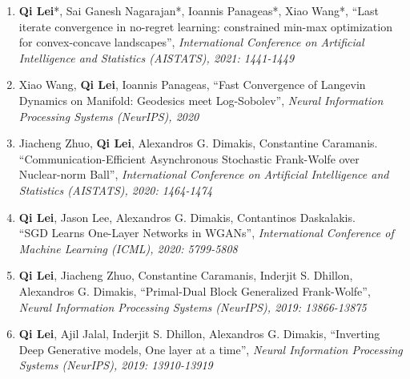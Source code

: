 \documentclass[margin, 10pt]{res} %
\begin{document}
\begin{resume}
\begin{enumerate}
	\item{\textbf{Qi Lei}*, Sai Ganesh Nagarajan*, Ioannis Panageas*, Xiao Wang*, ``Last iterate convergence in no-regret learning: constrained min-max optimization for convex-concave landscapes'',\textit{ International Conference on
			Artificial Intelligence and Statistics (AISTATS), 2021: 1441-1449}}
	\item{ Xiao Wang, \textbf{Qi Lei}, Ioannis Panageas, ``Fast Convergence of Langevin Dynamics on Manifold: Geodesics meet Log-Sobolev'', \textit{Neural Information Processing Systems (NeurIPS), 2020 }  }
\item{Jiacheng Zhuo, \textbf{Qi Lei}, Alexandros G. Dimakis, Constantine 
      Caramanis.\\ ``Communication-Efficient Asynchronous Stochastic 
    Frank-Wolfe over Nuclear-norm Ball'', \textit{ International Conference on Artificial Intelligence and Statistics (AISTATS), 2020: 1464-1474} }
\item{\textbf{Qi Lei}, Jason Lee, Alexandros G. Dimakis, Contantinos 
  Daskalakis. \\ ``SGD Learns One-Layer Networks in WGANs'', 
    \textit{International Conference of Machine Learning (ICML), 2020: 5799-5808}}
  \item{ \textbf{Qi Lei}, Jiacheng Zhuo, Constantine Caramanis, Inderjit S. 
    Dhillon, Alexandros G. Dimakis, ``Primal-Dual Block Generalized Frank-Wolfe'', 
  \textit{Neural Information Processing Systems (NeurIPS), 2019: 13866-13875} }
  \item{ \textbf{Qi Lei}, Ajil Jalal, Inderjit S. Dhillon, Alexandros G. 
      Dimakis, ``Inverting Deep Generative models, One layer at a time'', 
    \textit{Neural Information Processing Systems (NeurIPS), 2019: 13910-13919} }


\end{enumerate}
\end{resume}
\end{document}
